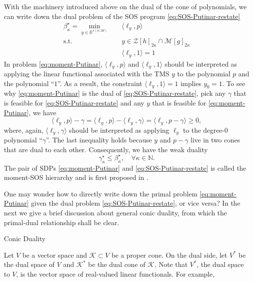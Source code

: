 \documentclass[
]{book}
\theoremstyle{definition}
\theoremstyle{definition}
\theoremstyle{definition}
\theoremstyle{definition}
\theoremstyle{remark}
\begin{document}
With the machinery introduced above on the dual of the cone of polynomials, we can write down the dual problem of the SOS program \eqref{eq:SOS-Putinar-restate}
\begin{equation}
\boxed{
\begin{split}
\beta_{\kappa}^\star = \min_{y \in \mathbb{R}^{s(n,2d)}} & \quad \langle \ell_y, p \rangle \\
\mathrm{s.t.}& \quad y \in \mathcal{Z}[h]_{2\kappa} \cap \mathcal{M}[g]_{2\kappa} \\
& \quad \langle \ell_y, 1 \rangle = 1
\end{split}
}
\label{eq:moment-Putinar}
\end{equation}
In problem \eqref{eq:moment-Putinar}, \(\langle \ell_y, p \rangle\) and \(\langle \ell_y, 1 \rangle\) should be interpreted as applying the linear functional associated with the TMS \(y\) to the polynomial \(p\) and the polynomial ``\(1\)''. As a result, the constraint \(\langle \ell_y, 1 \rangle=1\) implies \(y_0 = 1\). To see why \eqref{eq:moment-Putinar} is the dual of \eqref{eq:SOS-Putinar-restate}, pick any \(\gamma\) that is feasible for \eqref{eq:SOS-Putinar-restate} and any \(y\) that is feasible for \eqref{eq:moment-Putinar}, we have
\[
\langle \ell_y, p \rangle - \gamma = \langle \ell_y, p \rangle - \langle \ell_y, \gamma \rangle = \langle \ell_y, p - \gamma \rangle \geq 0,
\]
where, again, \(\langle \ell_y, \gamma \rangle\) should be interpreted as applying \(\ell_y\) to the degree-\(0\) polynomial ``\(\gamma\)''. The last inequality holds because \(y\) and \(p - \gamma\) live in two cones that are dual to each other. Consequently, we have the weak duality
\[
\gamma_{\kappa}^\star \leq \beta_{\kappa}^\star, \quad \forall \kappa \in \mathbb{N}.
\]
The pair of SDPs \eqref{eq:moment-Putinar} and \eqref{eq:SOS-Putinar-restate} is called the moment-SOS hierarchy and is first proposed in \citep{lasserre01siopt-global}.

One may wonder how to directly write down the primal problem \eqref{eq:moment-Putinar} given the dual problem \eqref{eq:SOS-Putinar-restate}, or vice versa? In the next we give a brief discussion about general conic duality, from which the primal-dual relationship shall be clear.

Conic Duality

Let \(V\) be a vector space and \(\mathcal{K}\subset V\) be a proper cone. On the dual side, let \(V^*\) be the dual space of \(V\) and \(\mathcal{K}^*\) be the dual cone of \(\mathcal{K}\). Note that \(V^*\), the dual space to \(V\), is the vector space of real-valued linear functionals. For example,
\end{document}
